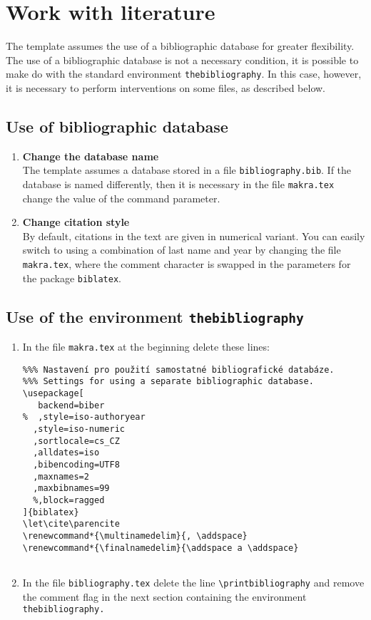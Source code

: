 \chapter{Work with literature}

The template assumes the use of a bibliographic database for greater flexibility. The use of a bibliographic database is not a necessary condition, it is possible to make do with the standard environment \texttt{thebibliography}. In this case, however, it is necessary to perform interventions on some files, as described below.

\section{Use of bibliographic database}

\begin{enumerate}
\item\textbf{Change the database name}\\
The template assumes a database stored in a file \texttt{bibliography.bib}. If the database is named differently, then it is necessary in the file \texttt{makra.tex} change the value of the  \verb'' command parameter.
\item\textbf{Change citation style}\\
By default, citations in the text are given in numerical variant. You can easily switch to using a combination of last name and year by changing the file \texttt{makra.tex}, where the comment character is swapped in the parameters for the package \texttt{biblatex}.
\end{enumerate}


\section{Use of the environment \texttt{thebibliography}}
\begin{enumerate}
\item In the file \texttt{makra.tex} at the beginning delete these lines:
\begin{verbatim}
%%% Nastavení pro použití samostatné bibliografické databáze.
%%% Settings for using a separate bibliographic database.
\usepackage[
   backend=biber
%  ,style=iso-authoryear
  ,style=iso-numeric
  ,sortlocale=cs_CZ
  ,alldates=iso
  ,bibencoding=UTF8
  ,maxnames=2
  ,maxbibnames=99
  %,block=ragged
]{biblatex}
\let\cite\parencite
\renewcommand*{\multinamedelim}{, \addspace}
\renewcommand*{\finalnamedelim}{\addspace a \addspace}


\end{verbatim}
\item In the file \texttt{bibliography.tex} delete the line \verb'\printbibliography' and remove the comment flag in the next section containing the environment \texttt{thebibliography.}
\end{enumerate}



